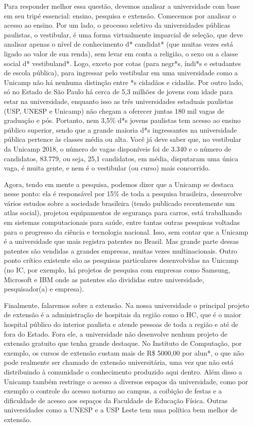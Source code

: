 Para responder melhor essa questão, devemos analisar a universidade com base em
seu tripé essencial: ensino, pesquisa e extensão. Comecemos por analisar o
acesso ao ensino. Por um lado, o processo seletivo da universidades públicas
paulistas, o vestibular, é uma forma virtualmente imparcial de seleção, que
deve analisar apenas o nível de conhecimento d* candidat* (que muitas vezes
está ligado ao valor de sua renda), sem levar em conta a religião, o sexo ou a
classe social d* vestibuland*. Logo, exceto por cotas (para negr*s, índi*s e
estudantes de escola pública), para ingressar pelo vestibular em uma
universidade como a Unicamp não há nenhuma distinção entre *s cidadãos e
cidadãs. Por outro lado, só no Estado de São Paulo há cerca de 5,3 milhões de
jovens com idade para estar na universidade, enquanto isso as três
universidades estaduais paulistas (USP, UNESP e Unicamp) não chegam a oferecer
juntas 180 mil vagas de graduação e pós. Portanto, nem 3,5\% d*s jovens
paulistas tem acesso ao ensino público superior, sendo que a grande maioria d*s
ingressantes na universidade pública pertence às classes média ou alta. Você
já deve saber que, no vestibular da Unicamp 2018, o número de vagas disponíveis
foi de 3.340 e o número de candidatos, 83.779, ou seja, 25,1 candidatos, em
média, disputaram uma única vaga, é muita gente, e nem é o vestibular (ou
curso) mais concorrido.

Agora, tendo em mente a pesquisa, podemos dizer que a Unicamp se destaca nesse
ponto: ela é responsável por 15\% de toda a pesquisa brasileira, desenvolve
vários estudos sobre a sociedade brasileira (tendo publicado recentemente um
atlas social), projetou equipamentos de segurança para carros, está trabalhando
em sistemas computacionais para saúde, entre tantas outras pesquisas voltadas
para o progresso da ciência e tecnologia nacional. Isso, sem contar que a
Unicamp é a universidade que mais registra patentes no Brasil. Mas grande parte
dessas patentes são vendidas a grandes empresas, muitas vezes multinacionais.
Outro ponto crítico existente são as pesquisas particulares desenvolvidas na
Unicamp (no IC, por exemplo, há projetos de pesquisa com empresas como Samsung,
Microsoft e IBM onde as patentes são divididas entre universidade,
pesquisador(a) e empresa).

Finalmente, falaremos sobre a extensão. Na nossa universidade o principal
projeto de extensão é a administração de hospitais da região como o HC, que é o
maior hospital público do interior paulista e atende pessoas de toda a região e
até de fora do Estado. Fora ele, a universidade não desenvolve nenhum projeto
de extensão gratuito que tenha grande destaque. No Instituto de Computação, por
exemplo, os cursos de extensão custam mais de R\$ 5000,00 por alun*, o que não
pode realmente ser chamado de extensão universitária, uma vez que não está
distribuindo à comunidade o conhecimento produzido aqui dentro.  Além disso a
Unicamp também restringe o acesso a diversos espaços da universidade, como por
exemplo o controle do acesso noturno ao campus, a coibição de festas e a
dificuldade de acesso aos espaços da Faculdade de Educação Física. Outras
universidades como a UNESP e a USP Leste tem uma política bem melhor de
extensão.


